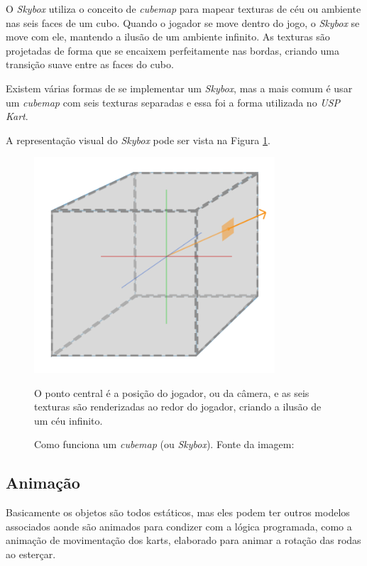 O \textit{Skybox} utiliza o conceito de \textit{cubemap} para mapear texturas de céu ou ambiente nas seis faces de um cubo. Quando o jogador se move dentro do jogo, o \textit{Skybox} se move com ele, mantendo a ilusão de um ambiente infinito. As texturas são projetadas de forma que se encaixem perfeitamente nas bordas, criando uma transição suave entre as faces do cubo.

Existem várias formas de se implementar um \textit{Skybox}, mas a mais comum é usar um \textit{cubemap} com seis texturas separadas e essa foi a forma utilizada no \textit{USP Kart}.

A representação visual do \textit{Skybox} pode ser vista na Figura \ref{fig:skybox}.

\begin{figure}[H]
    \centering
    \includegraphics[width=0.8\textwidth]{figuras/Skybox.png}
    \caption{Como funciona um \textit{cubemap} (ou \textit{Skybox}). Fonte da imagem: \cite{skybox}}
    \footnotesize{O ponto central é a posição do jogador, ou da câmera, e as seis texturas são renderizadas ao redor do jogador, criando a ilusão de um céu infinito.}
    \label{fig:skybox}
\end{figure}

\subsection{Animação}

Basicamente os objetos são todos estáticos, mas eles podem ter outros modelos associados aonde são animados para condizer com a lógica programada, como a animação de movimentação dos karts, elaborado para animar a rotação das rodas ao esterçar.

